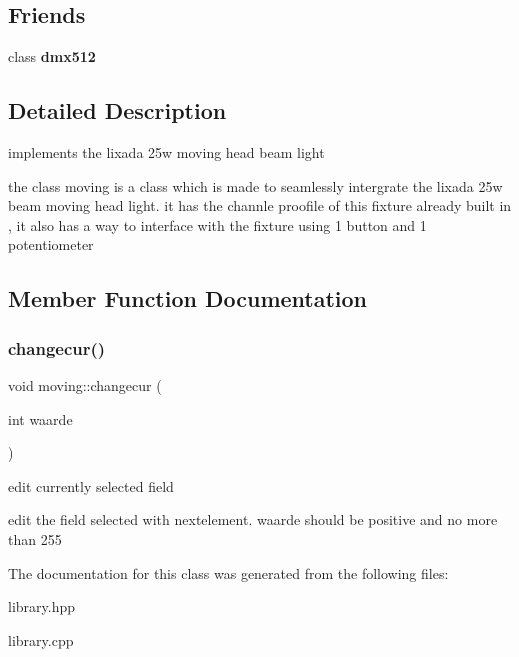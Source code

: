 \subsection*{Friends}
\begin{DoxyCompactItemize}
\item 
\mbox{\label{classmoving_ad452cf6ae878aaba449cab79e48a0f62}} 
class {\bfseries dmx512}
\end{DoxyCompactItemize}


\subsection{Detailed Description}
implements the lixada 25w moving head beam light 

the class moving is a class which is made to seamlessly intergrate the lixada 25w beam moving head light. it has the channle proofile of this fixture already built in , it also has a way to interface with the fixture using 1 button and 1 potentiometer 

\subsection{Member Function Documentation}
\mbox{\label{classmoving_ae1d3737dbfcf7d8e484d8e79c62ae7c4}} 
\subsubsection{\texorpdfstring{changecur()}{changecur()}}
{\footnotesize\ttfamily void moving\+::changecur (\begin{DoxyParamCaption}\item[{int}]{waarde }\end{DoxyParamCaption})}



edit currently selected field 

edit the field selected with nextelement. waarde should be positive and no more than 255 

The documentation for this class was generated from the following files\+:\begin{DoxyCompactItemize}
\item 
library.\+hpp\item 
library.\+cpp\end{DoxyCompactItemize}
